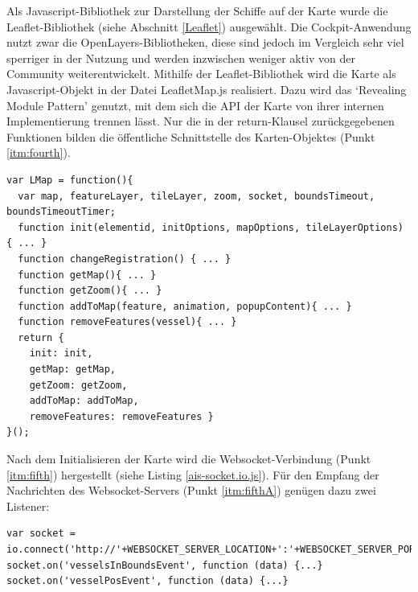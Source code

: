 Als Javascript-Bibliothek zur Darstellung der Schiffe auf der Karte wurde die Leaflet-Bibliothek (siehe Abschnitt \ref{Leaflet}) ausgewählt. Die Cockpit-Anwendung nutzt zwar die OpenLayers-Bibliotheken, diese sind jedoch im Vergleich sehr viel sperriger in der Nutzung und werden inzwischen weniger aktiv von der Community weiterentwickelt. Mithilfe der Leaflet-Bibliothek wird die Karte als Javascript-Objekt in der Datei LeafletMap.js realisiert. Dazu wird das ‘Revealing Module Pattern’ genutzt, mit dem sich die API der Karte von ihrer internen Implementierung trennen lässt. Nur die in der return-Klausel zurückgegebenen Funktionen bilden die öffentliche Schnittstelle des Karten-Objektes (Punkt \ref{itm:fourth}).

\begin{lstlisting}[caption= ‘Revealing Module Pattern’ in LeafletMap.js, label=LeafletMap.js]
var LMap = function(){
  var map, featureLayer, tileLayer, zoom, socket, boundsTimeout, boundsTimeoutTimer;
  function init(elementid, initOptions, mapOptions, tileLayerOptions) { ... }
  function changeRegistration() { ... } 
  function getMap(){ ... }
  function getZoom(){ ... }
  function addToMap(feature, animation, popupContent){ ... } 
  function removeFeatures(vessel){ ... }
  return {
    init: init,
    getMap: getMap,
    getZoom: getZoom,
    addToMap: addToMap,
    removeFeatures: removeFeatures }
}();
\end{lstlisting}
Nach dem Initialisieren der Karte wird die Websocket-Verbindung (Punkt \ref{itm:fifth}) hergestellt (siehe Listing \ref{ais-socket.io.js}). Für den Empfang der Nachrichten des Websocket-Servers (Punkt \ref{itm:fifthA}) genügen dazu zwei Listener: 
\begin{lstlisting}[caption=Client-Seite der socket.io-Websocket-Verbindung in ais-socket.io.js,  label=ais-socket.io.js]
 var socket = io.connect('http://'+WEBSOCKET_SERVER_LOCATION+':'+WEBSOCKET_SERVER_PORT);
socket.on('vesselsInBoundsEvent', function (data) {...}
socket.on('vesselPosEvent', function (data) {...}
\end{lstlisting}

